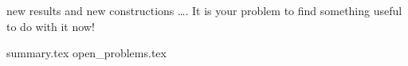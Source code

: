 
\label{cha:conclusion}


 new results and new constructions \dots.
It is your problem to find something useful to do with it now!

{summary.tex}
{open_problems.tex}